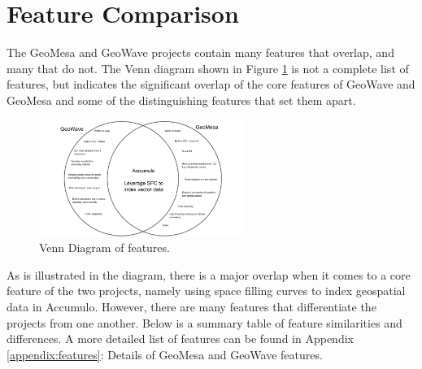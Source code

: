 \section{Feature Comparison}
\label{sec:featurecompare}

The GeoMesa and GeoWave projects contain many features that overlap, and many that do not.
The Venn diagram shown in Figure \ref{venn} is not a complete list of features,
but indicates the significant overlap of the core features of GeoWave and GeoMesa and some of the distinguishing features that set them apart.

\begin{figure}[h!tb]
  \centering
  \includegraphics[width=0.60\textwidth]{../docs/img/venn-diagram.png}
  \caption{Venn Diagram of features.}
  \label{venn}
\end{figure}

As is illustrated in the diagram, there is a major overlap when it comes to a core feature of the two projects, namely using space filling curves to index geospatial data in Accumulo.
However, there are many features that differentiate the projects from one another.
Below is a summary table of feature similarities and differences.
A more detailed list of features can be found in Appendix \ref{appendix:features}: Details of GeoMesa and GeoWave features.





